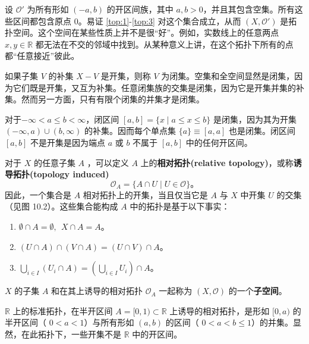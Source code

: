 \begin{eg}\label{eg:10.2}
	设 $\mathcal{O} '$ 为所有形如 $(-a,b)$ 的开区间族，其中 $a,b >0$，并且其包含空集。所有这些区间都包含原点 0。易证 \ref{top:1}-\ref{top:3} 对这个集合成立，从而 $(X,\mathcal{O} ')$ 是拓扑空间。这个空间在某些性质上并不是很“好”。例如，实数线上的任意两点 $x,y\in \mathbb{R}$ 都无法在不交的邻域中找到。从某种意义上讲，在这个拓扑下所有的点都“任意接近”彼此。
\end{eg}

	如果子集 $V$ 的补集 $X-V$ 是开集，则称 $V$ 为闭集。空集和全空间显然是闭集，因为它们既是开集，又互为补集。任意闭集族的交集是闭集，因为它是开集并集的补集。然而另一方面，只有有限个闭集的并集才是闭集。

\begin{eg}\label{eg:10.3}
	 对于$-\infty < a\leq b< \infty $，闭区间 $[a,b]=\{x\mid a\leq x\leq b\}$ 是闭集，因为其为开集 $(-\infty ,a)\cup (b,\infty )$ 的补集。因而每个单点集 $\{a\}\equiv [a,a]$ 也是闭集。闭区间 $[a,b]$ 不是开集是因为端点 $a$ 或 $b$ 不属于 $[a,b]$ 中的任何开区间。
\end{eg}

对于 $X$ 的任意子集 $A$ ，可以定义 $A$ 上的\textbf{相对拓扑(relative topology)}，或称\textbf{诱导拓扑(topology induced)}
\begin{equation*}
    \mathcal{O}_{A} =\{A\cap U\mid U\in \mathcal{O} \}。
\end{equation*}
因此，一个集合是 $A$ 相对拓扑上的开集，当且仅当它是 $A$ 与 $X$ 中开集 $U$ 的交集（见图 10.2）。这些集合能构成 $A$ 中的拓扑是基于以下事实：

\begin{enumerate}[label=(\arabic*)]
	\item		$\emptyset \cap A=\emptyset ,\ \ X\cap A=A$。
	\item		$(U\cap A)\cap (V\cap A)=(U\cap V)\cap A$。
	\item		$\bigcup _{i\in I} (U_{i} \cap A)=\left(\bigcup _{i\in I} U_{i}\right) \cap A$。
\end{enumerate}

 $X$ 的子集 $A$ 和在其上诱导的相对拓扑 $\mathcal{O}_{A}$ 一起称为 $(X,\mathcal{O} )$ 的一个\textbf{子空间}。

\begin{eg}\label{eg:10.4}
	$\mathbb{R}$ 上的标准拓扑，在半开区间 $A=[ 0,1)\subset \mathbb{R}$ 上诱导的相对拓扑，是形如 $[0,a)$ 的半开区间（ $0< a< 1$）与所有形如 $(a,b)$ 的区间（ $0< a< b\leq 1$）的并集。显然，在此拓扑下，一些开集不是 $\mathbb{R}$ 中的开区间。
\end{eg}

